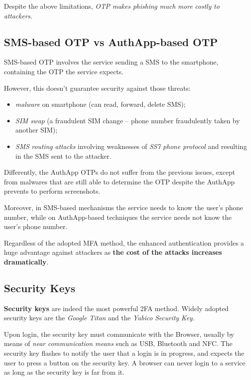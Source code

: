 \documentclass[10pt]{extbook}
\begin{document}
Despite the above limitations, \emph{OTP makes phishing much more costly to
attackers}.

\subsection{SMS\--based OTP vs AuthApp\--based OTP}

SMS\--based OTP involves the service sending a SMS to the smartphone,
containing the OTP the service expects.

However, this doesn't guarantee security against those threats:
\begin{itemize}
    \item \emph{malware} on smartphone (can read, forward, delete SMS);
    \item \emph{SIM swap} (a fraudulent SIM change -- phone number fraudulently
        taken by another SIM);
    \item \emph{SMS routing attacks} involving weaknesses of \emph{SS7 phone
        protocol} and resulting in the SMS sent to the attacker.
\end{itemize}

Differently, the AuthApp OTPs do not suffer from the previous issues, except
from malwares that are still able to determine the OTP despite the AuthApp
prevents to perform screenshots.

Moreover, in SMS\--based mechanisms the service needs to know the user's phone
number, while on AuthApp\--based techniques the service needs not know the
user's phone number.

Regardless of the adopted MFA method, the enhanced authentication provides a
huge advantage against attackers as \textbf{the cost of the attacks increases
dramatically}.

\subsection{Security Keys}

\textbf{Security keys} are indeed the most powerful 2FA method. Widely adopted
security keys are the \emph{Google Titan} and the \emph{Yubico Security Key}.

Upon login, the security key must communicate with the Browser, usually by
means of \emph{near communication means} such as USB, Bluetooth and NFC. The
security key flashes to notify the user that a login is in progress, and
expects the user to press a button on the security key. A browser can never
login to a service as long as the security key is far from it.
\end{document}
